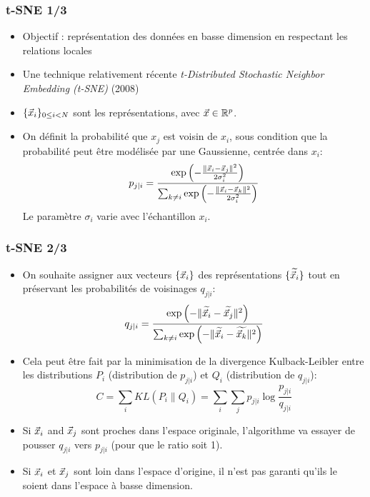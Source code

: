\begin{frame}
\frametitle{t-SNE 1/3}
\begin{itemize}
	\item Objectif : représentation des données en basse dimension en respectant les relations locales
	\item Une technique relativement récente  \emph{t-Distributed Stochastic Neighbor Embedding (t-SNE)} (2008)
	\item $\{\vec{x}_i\}_{0\leq i < N}$ sont les représentations, avec $\vec{x} \in {\mathbb R}^p$. 
	\item On définit la probabilité que $x_j$ est voisin de $x_i$, sous condition que la probabilité peut être modélisée par une Gaussienne, centrée dans $x_i$:  
	\begin{equation}
	p_{j|i} = \frac{\exp{\left(-\frac{\|\vec{x}_i - \vec{x}_j\|^2}{2 \sigma_i^2}\right)}}{\sum_{k\neq i} \exp{\left(-\frac{\|\vec{x}_i - \vec{x}_k\|^2}{2 \sigma_i^2}\right)} }
	\end{equation}
	Le paramètre $\sigma_i$ varie avec l'échantillon $x_i$. 
\end{itemize}
\end{frame}


\begin{frame}
\frametitle{t-SNE 2/3}
\begin{itemize}
	\item On souhaite assigner aux vecteurs $\{\vec{x}_i\}$ des représentations $\{\widetilde{\vec{x}_i}\}$ tout en préservant les probabilités de voisinages $q_{j|i}$: 
	\begin{equation*}
	q_{j|i} = \frac{\exp{\left(-\|\widetilde{\vec{x}_i} - \widetilde{\vec{x}_j}\|^2\right)}}{\sum_{k\neq i} \exp{\left(-\|\widetilde{\vec{x}_i} - \widetilde{\vec{x}_k}\|^2\right)} }
	\end{equation*}
	\item Cela peut être fait par la minimisation de la divergence Kulback-Leibler entre les distributions $P_i$ (distribution de $p_{j|i}$) et $Q_i$ (distribution de $q_{j|i}$): 
	\begin{equation}
		C = \sum_i KL(P_i\|Q_i) = \sum_i \sum_j p_{j|i}\log{\frac{p_{j|i}}{q_{j|i}}}
	\end{equation}
	\item Si $\vec{x}_i$ and $\vec{x}_j$ sont proches dans l'espace originale, l'algorithme va essayer de pousser $q_{j|i}$ vers $p_{j|i}$ (pour que le ratio soit 1). 
	\item Si $\vec{x}_i$ et $\vec{x}_j$ sont loin dans l'espace d'origine, il n'est pas garanti qu'ils le soient dans l'espace à basse dimension. 
\end{itemize}
\end{frame}

